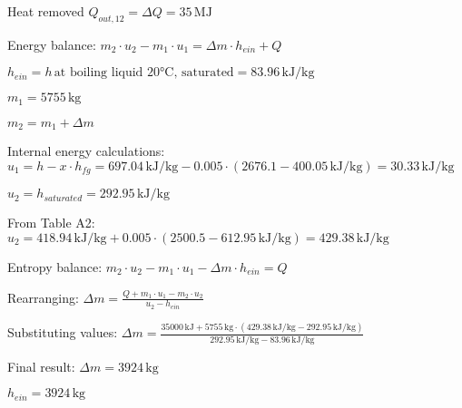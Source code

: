 Heat removed \( Q_{out,12} = \Delta Q = 35 \, \text{MJ} \)  

Energy balance:  
\( m_2 \cdot u_2 - m_1 \cdot u_1 = \Delta m \cdot h_{ein} + Q \)  

\( h_{ein} = h \, \text{at boiling liquid 20°C, saturated} = 83.96 \, \text{kJ/kg} \)  

\( m_1 = 5755 \, \text{kg} \)  

\( m_2 = m_1 + \Delta m \)  

Internal energy calculations:  
\( u_1 = h - x \cdot h_{fg} = 697.04 \, \text{kJ/kg} - 0.005 \cdot (2676.1 - 400.05 \, \text{kJ/kg}) = 30.33 \, \text{kJ/kg} \)  

\( u_2 = h_{saturated} = 292.95 \, \text{kJ/kg} \)  

From Table A2:  
\( u_2 = 418.94 \, \text{kJ/kg} + 0.005 \cdot (2500.5 - 612.95 \, \text{kJ/kg}) = 429.38 \, \text{kJ/kg} \)  

Entropy balance:  
\( m_2 \cdot u_2 - m_1 \cdot u_1 - \Delta m \cdot h_{ein} = Q \)  

Rearranging:  
\( \Delta m = \frac{Q + m_1 \cdot u_1 - m_2 \cdot u_2}{u_2 - h_{ein}} \)  

Substituting values:  
\( \Delta m = \frac{35000 \, \text{kJ} + 5755 \, \text{kg} \cdot (429.38 \, \text{kJ/kg} - 292.95 \, \text{kJ/kg})}{292.95 \, \text{kJ/kg} - 83.96 \, \text{kJ/kg}} \)  

Final result:  
\( \Delta m = 3924 \, \text{kg} \)  

\( h_{ein} = 3924 \, \text{kg} \)